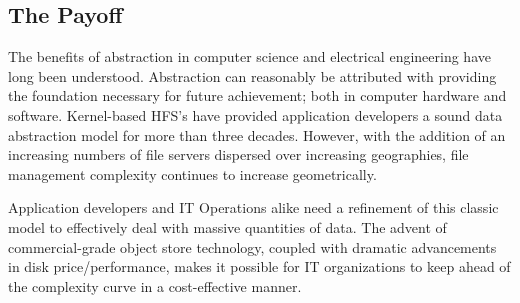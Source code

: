 \subsection{The Payoff}

The benefits of abstraction in computer science and electrical
engineering have long been understood. Abstraction can reasonably be
attributed with providing the foundation necessary for future
achievement; both in computer hardware and software. Kernel-based HFS's
have provided application developers a sound data abstraction model for
more than three decades. However, with the addition of an increasing
numbers of file servers dispersed over increasing geographies, file
management complexity continues to increase geometrically.

Application developers and IT Operations alike need a refinement of this
classic model to effectively deal with massive quantities of data. The
advent of commercial-grade object store technology, coupled with
dramatic advancements in disk price/performance, makes it possible for
IT organizations to keep ahead of the complexity curve in a
cost-effective manner.

